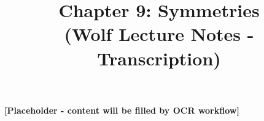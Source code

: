 \documentclass{article}
\title{Chapter 9: Symmetries \\ {\small (Wolf Lecture Notes - Transcription)}}
\date{}
\begin{document}
\maketitle
\tableofcontents

\textbf{[Placeholder - content will be filled by OCR workflow]}
\end{document}

